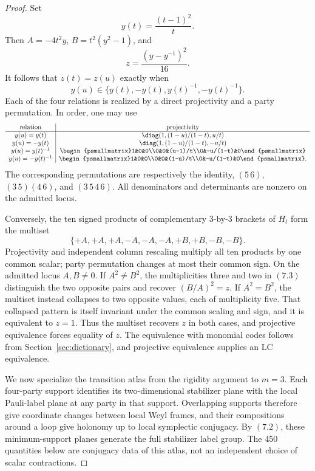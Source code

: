 \begin{proof}
Set
\[
 y(t)=\frac{(t-1)^2}{t}.
\]
Then \(A=-4t^2y\), \(B=t^2(y^2-1)\), and
\[
 z=\frac{(y-y^{-1})^2}{16}.
\]
It follows that \(z(t)=z(u)\) exactly when
\[
 y(u)\in\{y(t),-y(t),y(t)^{-1},-y(t)^{-1}\}.            \tag{7.2}
\]
Each of the four relations is realized by a direct projectivity and a
party permutation.  In order, one may use
\[
\begin{array}{c|c}
\text{relation}&\text{projectivity}\\ \hline
y(u)=y(t)&\diag(1,(1-u)/(1-t),u/t)\\
y(u)=-y(t)&\diag(1,(1-u)/(1-t),-u/t)\\
y(u)=y(t)^{-1}&
\begin{psmallmatrix}1&0&0\\0&0&(u-1)/t\\0&-u/(1-t)&0\end{psmallmatrix}\\
y(u)=-y(t)^{-1}&
\begin{psmallmatrix}1&0&0\\0&0&(1-u)/t\\0&-u/(1-t)&0\end{psmallmatrix}.
\end{array}
\]
The corresponding permutations are respectively the identity,
\((5\,6)\), \((3\,5)(4\,6)\), and \((3\,5\,4\,6)\).
All denominators and determinants are nonzero on the admitted locus.

Conversely, the ten signed products of complementary \(3\)-by-\(3\)
brackets of \(H_t\) form the multiset
\[
\{+A,+A,+A,-A,-A,-A,+B,+B,-B,-B\}.                    \tag{7.3}
\]
Projectivity and independent column rescaling multiply all ten products
by one common scalar; party permutation changes at most their common
sign.  On the admitted locus \(A,B\ne0\).  If \(A^2\ne B^2\), the
multiplicities three and two in \((7.3)\) distinguish the two opposite
pairs and recover \((B/A)^2=z\).  If \(A^2=B^2\), the multiset instead
collapses to two opposite values, each of multiplicity five.  That
collapsed pattern is itself invariant under the common scaling and sign,
and it is equivalent to \(z=1\).  Thus the multiset recovers \(z\) in
both cases, and projective equivalence forces equality of \(z\).
The equivalence with monomial codes follows from
Section~\ref{sec:dictionary}, and projective equivalence supplies an LC
equivalence.

We now specialize the transition atlas from the rigidity argument to
\(m=3\).  Each four-party support identifies
its two-dimensional stabilizer plane with the local Pauli-label plane at
any party in that support.  Overlapping supports therefore give coordinate
changes between local Weyl frames, and their compositions around a loop
give holonomy up to local symplectic conjugacy.  By \((7.2)\), these
minimum-support planes generate the full stabilizer label group.  The
450 quantities below are conjugacy data of this atlas, not an independent
choice of scalar contractions.


\end{proof}
